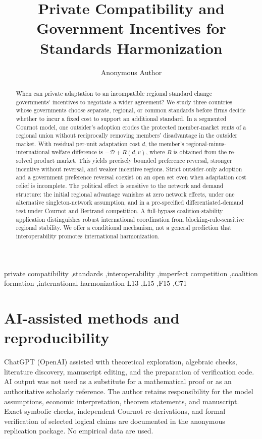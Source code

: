 \documentclass[12pt,review,authoryear,nopreprintline]{elsarticle}
\begin{document}
\begin{frontmatter}
\title{Private Compatibility and Government Incentives for Standards Harmonization}
\author{Anonymous Author}
\begin{abstract}
When can private adaptation to an incompatible regional standard change governments' incentives to negotiate a wider agreement? We study three countries whose governments choose separate, regional, or common standards before firms decide whether to incur a fixed cost to support an additional standard. In a segmented Cournot model, one outsider's adoption erodes the protected member-market rents of a regional union without reciprocally removing members' disadvantage in the outsider market. With residual per-unit adaptation cost $d$, the member's regional-minus-international welfare difference is $-\mathscr D+R(d,v)$, where $R$ is obtained from the re-solved product market. This yields precisely bounded preference reversal, stronger incentive without reversal, and weaker incentive regions. Strict outsider-only adoption and a government preference reversal coexist on an open set even when adaptation cost relief is incomplete. The political effect is sensitive to the network and demand structure: the initial regional advantage vanishes at zero network effects, under one alternative singleton-network assumption, and in a pre-specified differentiated-demand test under Cournot and Bertrand competition. A full-bypass coalition-stability application distinguishes robust international coordination from blocking-rule-sensitive regional stability. We offer a conditional mechanism, not a general prediction that interoperability promotes international harmonization.
\end{abstract}
\begin{keyword}
private compatibility \sep standards \sep interoperability \sep imperfect competition \sep coalition formation \sep international harmonization
\JEL L13 \sep L15 \sep F15 \sep C71
\end{keyword}
\end{frontmatter}
\makeatletter
{}
\makeatother






\section*{AI-assisted methods and reproducibility}
ChatGPT (OpenAI) assisted with theoretical exploration, algebraic checks,
literature discovery, manuscript editing, and the preparation of verification
code. AI output was not used as a substitute for a mathematical proof or as
an authoritative scholarly reference. The author retains responsibility for
the model assumptions, economic interpretation, theorem statements, and
manuscript. Exact symbolic checks, independent Cournot re-derivations, and
formal verification of selected logical claims are documented in the
anonymous replication package. No empirical data are used.
\end{document}
